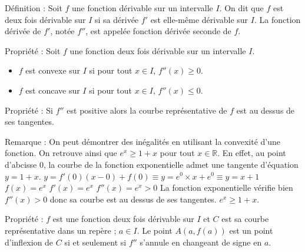 \documentclass[11pt,a4paper]{article}
\begin{document}
\begin{boiteDef}{Définition :}
    Soit $f$ une fonction dérivable sur un intervalle $I$.
    \newline
    On dit que $f$ est deux fois dérivable sur $I$ si sa dérivée $f'$ est elle-même dérivable sur $I$. 
    \newline
    La fonction dérivée de $f'$, notée $f''$, est appelée fonction dérivée seconde de $f$.
\end{boiteDef}

\begin{boiteProp}{Propriété :}
    Soit $f$ une fonction deux fois dérivable sur un intervalle $I$.
    \begin{itemize}
        \item $f$ est convexe sur $I$ si pour tout $x \in I$, $f''(x) \geq 0$.
        \item $f$ est concave sur $I$ si pour tout $x \in I$, $f''(x) \leq 0$.
    \end{itemize}
\end{boiteProp}

\begin{boiteProp}{Propriété :}
    Si $f''$ est positive alors la courbe représentative de $f$ est au dessus de ses tangentes.    
\end{boiteProp}

\begin{boiteRemarque}{Remarque :}
    On peut démontrer des inégalités en utilisant la convexité d'une fonction.
    \newline
    On retrouve ainsi que $e^x \geq 1 + x$ pour tout $x \in \mathbb{R}$.
    \newline
    En effet, au point d'abcisse $0$, la courbe de la fonction exponentielle admet une tangente d'équation $y = 1 + x$. 
    \newline
    $y = f'(0)(x - 0) + f(0) \equiv y = e^0 \times x + e^0 \equiv y = x + 1$
    \newline
    $f(x) = e^x$ $f'(x) = e^x$ $f''(x) = e^x > 0$ 
    \newline
    La fonction exponentielle vérifie bien $f''(x) > 0$ donc sa courbe est au dessus de ses tangentes.
    \newline
    $e^x \geq 1 + x$.    
\end{boiteRemarque}

\begin{boiteProp}{Propriété :}
    $f$ est une fonction deux fois dérivable sur $I$ et $C$ est sa courbe représentative dans un repère ; $a \in I$.
    \newline
    Le point $A(a, f(a))$ est un point d'inflexion de $C$ si et seulement si $f''$ s'annule en changeant de signe en $a$.    
\end{boiteProp}
\end{document}
